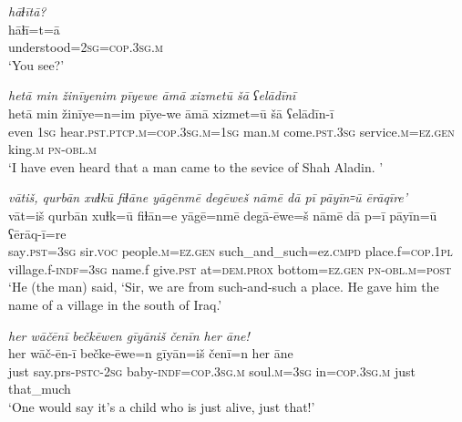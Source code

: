 \ea \label{ZB.61}
\textit{hāɫītā?} \\ 
\gll hāɫī=t=ā \\ 
 understood\textsc{=\textsc{2sg}}\textsc{=cop}\textsc{.3sg}\textsc{.m} \\ 
\glt `You see?'
\z 



\ea \label{ZQ.2}
\textit{hetā min žinīyenim pīyewe āmā xizmetū šā ʕelādīnī} \\ 
\gll hetā min žinīye=n=im pīye-we āmā xizmet=ū šā ʕelādīn-ī \\ 
 even \textsc{1sg} hear\textsc{.pst}\textsc{.ptcp}\textsc{.m}\textsc{=cop}\textsc{.3sg}\textsc{.m}\textsc{=\textsc{1sg}} man\textsc{.m} come\textsc{.pst}\textsc{.3sg} service\textsc{.m}\textsc{=ez.gen} king\textsc{.m} \textsc{pn}\textsc{-obl}\textsc{.m} \\ 
\glt `I have even heard that a man came to the sevice of Shah Aladin. '
\z 
 
\ea \label{ZQ.5}
\textit{vātiš, qurbān xuɫkū fiɫāne yāgēnmē degēweš nāmē dā pī pāyīn꞊ū ērāqīre'} \\ 
\gll vāt=iš qurbān xuɫk=ū fiɫān=e yāgē=nmē degā-ēwe=š nāmē dā p=ī pāyīn=ū ʕērāq-ī=re \\ 
 say\textsc{.pst}\textsc{=3sg} sir.\textsc{voc} people\textsc{.m}\textsc{=ez.gen} such\_and\_such=ez\textsc{.cmpd} place.f\textsc{=cop}\textsc{.\textsc{1pl}} village.f\textsc{-indf}\textsc{=3sg} name.f give\textsc{.pst} at=\textsc{dem.prox} bottom\textsc{=ez.gen} \textsc{pn}\textsc{-obl}\textsc{.m}\textsc{=\textsc{post}} \\ 
\glt `He (the man) said, ‘Sir, we are from such-and-such a place. He gave him the name of a village in the south of Iraq.'
\z 
 
\ea \label{ZQ.20}
\textit{her wāčēnī bečkēwen gīyāniš čenīn her āne!} \\ 
\gll her wāč-ēn-ī bečke-ēwe=n gīyān=iš čenī=n her āne \\ 
 just say.prs\textsc{-pstc}-\textsc{2sg} baby\textsc{-indf}\textsc{=cop}\textsc{.3sg}\textsc{.m} soul\textsc{.m}\textsc{=3sg} in\textsc{=cop}\textsc{.3sg}\textsc{.m} just that\_much \\ 
\glt `One would say it’s a child who is just alive, just that!'
\z 
 
